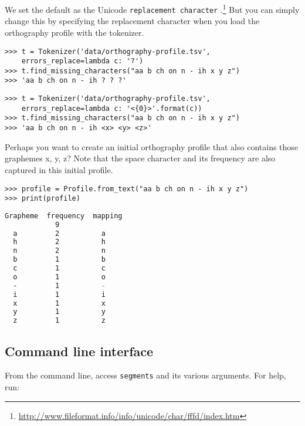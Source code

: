 \noindent We set the default as the Unicode \texttt{replacement character} .\footnote{\url{http://www.fileformat.info/info/unicode/char/fffd/index.htm}} But you can simply change this by specifying the replacement character when you load the orthography profile with the tokenizer.


\begin{lstlisting}
>>> t = Tokenizer('data/orthography-profile.tsv', 
	errors_replace=lambda c: '?')
>>> t.find_missing_characters("aa b ch on n - ih x y z")
>>> 'aa b ch on n - ih ? ? ?'
\end{lstlisting}

\begin{lstlisting}
>>> t = Tokenizer('data/orthography-profile.tsv', 
	errors_replace=lambda c: '<{0}>'.format(c))
>>> t.find_missing_characters("aa b ch on n - ih x y z")
>>> 'aa b ch on n - ih <x> <y> <z>'
\end{lstlisting}

\noindent Perhaps you want to create an initial orthography profile that also contains those graphemes x, y, z? Note that the space character and its frequency are also captured in this initial profile.

\begin{lstlisting}
>>> profile = Profile.from_text("aa b ch on n - ih x y z")
>>> print(profile)
\end{lstlisting}


\begin{lstlisting}[language=bash,texcl=true]
  Grapheme  frequency  mapping
            9
  a         2          a
  h         2          h
  n         2          n
  b         1          b
  c         1          c
  o         1          o
  -         1          -
  i         1          i
  x         1          x
  y         1          y
  z         1          z
\end{lstlisting}


\subsection*{Command line interface}

From the command line, access \texttt{segments} and its 
various arguments. For help, run:

